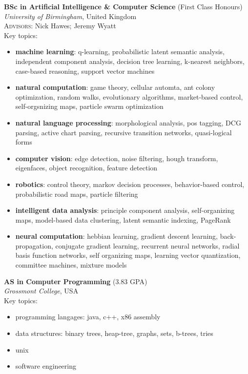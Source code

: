 \documentclass[10pt, a4paper]{article}
\newcommand{\years}[1]{\marginnote{\scriptsize #1}}
\begin{document}
\years{2012}
\textbf{BSc in Artificial Intelligence \& Computer Science} (First Class Honours)\\
\textsl{University of Birmingham}, United Kingdom\\
\small{\textsc{Advisors:} Nick Hawes; Jeremy Wyatt}\\[.2cm]
Key topics:
\begin{itemize}
\item \textbf{machine learning}: q-learning, probabilistic latent
  semantic analysis, independent component analysis, decision tree
  learning, k-nearest neighbors, case-based reasoning, support vector
  machines
\item \textbf{natural computation}: game theory, cellular automta, ant
  colony optimization, random walks, evolutionary algorithms,
  market-based control, self-orgsnizing maps, particle swarm
  optimization
\item \textbf{natural language processing}: morphological analysis,
  pos tagging, DCG parsing, active chart parsing, recursive transition
  networks, quasi-logical forms
\item \textbf{computer vision}: edge detection, noise filtering, hough
  transform, eigenfaces, object recognition, feature detection
\item \textbf{robotics}: control theory, markov decision processes,
  behavior-based control, probabilistic road maps, particle filtering
\item \textbf{intelligent data analysis}: principle component
  analysis, self-organizing maps, model-based data clustering, latent
  semantic indexing, PageRank
\item \textbf{neural computation}: hebbian learning, gradient descent
  learning, back-propagation, conjugate gradient learning, recurrent
  neural networks, radial basis function networks, self organizing
  maps, learning vector quantization, committee machines, mixture
  models
\end{itemize}
\vspace{.25cm}

\years{2009}
\textbf{AS in Computer Programming} (3.83 GPA)\\
\textit{Grossmont College}, USA\\[.2cm]
Key topics:
\begin{itemize}
\item programming langages: java, c++, x86 assembly
\item data structures: binary trees, heap-tree, graphs, sets,
  b-trees, tries
\item unix
\item software engineering
\end{itemize}
\end{document}
